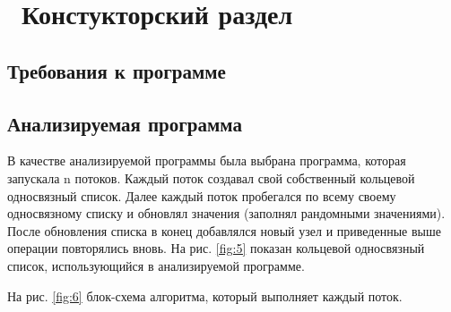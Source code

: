 \chapter{ Констукторский раздел}
\label{cha:design}

\section{Требования к программе}

\section{Анализируемая программа}

В качестве анализируемой программы  была выбрана программа, 
которая запускала n потоков. 
Каждый поток создавал свой собственный кольцевой односвязный список.
Далее каждый поток пробегался по всему своему односвязному списку 
и обновлял значения (заполнял рандомными значениями).
После обновления списка в конец добавлялся новый узел 
и приведенные выше операции повторялись вновь. 
На рис. \ref{fig:5} показан кольцевой односвязный список, использующийся в анализируемой программе.

\begin{figure}[ht!]
\end{figure}

На рис. \ref{fig:6} блок-схема алгоритма, который выполняет каждый поток. 

